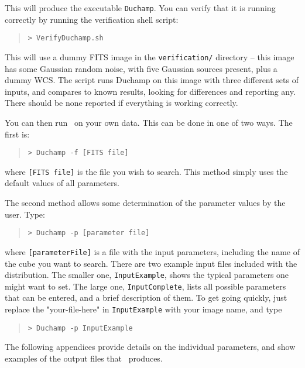 This will produce the executable \texttt{Duchamp}. You can verify that
it is running correctly by running the verification shell script:
\begin{quote}
\texttt{> VerifyDuchamp.sh}
\end{quote}
This will use a dummy FITS image in the \texttt{verification/}
directory -- this image has some Gaussian random noise, with five
Gaussian sources present, plus a dummy WCS. The script runs
Duchamp on this image with three different sets of inputs, and
compares to known results, looking for differences and reporting
any. There should be none reported if everything is working correctly.

You can then run \duchamp\ on your own data. This can be done in one
of two ways. The first is:
\begin{quote}
\texttt{> Duchamp -f [FITS file]}
\end{quote}
where \texttt{[FITS file]} is the file you wish to search. This method
simply uses the default values of all parameters.

The second method allows some determination of the parameter values by
the user. Type:
\begin{quote}
\texttt{> Duchamp -p [parameter file]}
\end{quote}
where \texttt{[parameterFile]} is a file with the input parameters,
including the name of the cube you want to search. There are two
example input files included with the distribution. The smaller one,
\texttt{InputExample}, shows the typical parameters one might want to
set. The large one, \texttt{InputComplete}, lists all possible
parameters that can be entered, and a brief description of them. To
get going quickly, just replace the "your-file-here" in
\texttt{InputExample} with your image name, and type
\begin{quote}
\texttt{> Duchamp -p InputExample}
\end{quote}

The following appendices provide details on the individual parameters,
and show examples of the output files that \duchamp\ produces.

